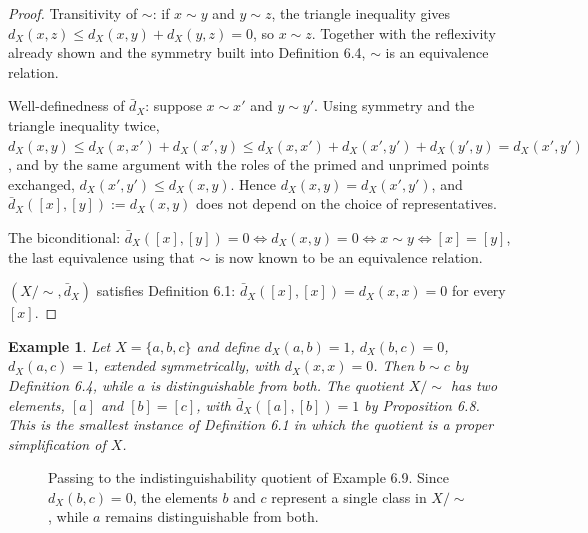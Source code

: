 \documentclass[11pt]{book}
\newtheorem{example}[theorem]{Example}
\begin{document}
\begin{proof}
Transitivity of $\sim$: if $x \sim y$ and $y \sim z$, the triangle inequality gives $d_X(x,z) \leq d_X(x,y) + d_X(y,z) = 0$, so $x \sim z$. Together with the reflexivity already shown and the symmetry built into Definition 6.4, $\sim$ is an equivalence relation.

Well-definedness of $\bar d_X$: suppose $x \sim x'$ and $y \sim y'$. Using symmetry and the triangle inequality twice, $d_X(x,y) \leq d_X(x,x') + d_X(x',y) \leq d_X(x,x') + d_X(x',y') + d_X(y',y) = d_X(x',y')$, and by the same argument with the roles of the primed and unprimed points exchanged, $d_X(x',y') \leq d_X(x,y)$. Hence $d_X(x,y) = d_X(x',y')$, and $\bar d_X([x],[y]) := d_X(x,y)$ does not depend on the choice of representatives.

The biconditional: $\bar d_X([x],[y]) = 0 \iff d_X(x,y) = 0 \iff x \sim y \iff [x] = [y]$, the last equivalence using that $\sim$ is now known to be an equivalence relation.

$(X/\!\sim, \bar d_X)$ satisfies Definition 6.1: $\bar d_X([x],[x]) = d_X(x,x) = 0$ for every $[x]$.
\end{proof}

\begin{example}
Let $X = \{a,b,c\}$ and define $d_X(a,b) = 1$, $d_X(b,c) = 0$, $d_X(a,c) = 1$, extended symmetrically, with $d_X(x,x) = 0$. Then $b \sim c$ by Definition 6.4, while $a$ is distinguishable from both. The quotient $X/\!\sim$ has two elements, $[a]$ and $[b]=[c]$, with $\bar d_X([a],[b]) = 1$ by Proposition 6.8. This is the smallest instance of Definition 6.1 in which the quotient is a proper simplification of $X$.
\end{example}

\begin{figure}[htb]
\centering
{}
\caption{Passing to the indistinguishability quotient of Example 6.9. Since $d_X(b,c)=0$, the elements $b$ and $c$ represent a single class in $X/\!\sim$, while $a$ remains distinguishable from both.}
\label{fig:distinction-quotient}
\end{figure}
\end{document}
